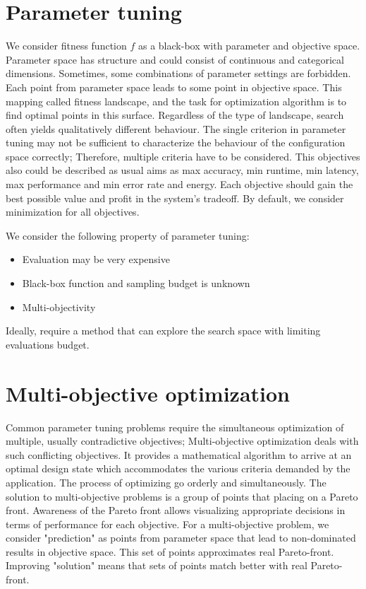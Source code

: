     \section{Parameter tuning}
        We consider fitness function $f$ as a black-box with parameter and objective space. Parameter space has structure and could consist of continuous and categorical dimensions. Sometimes, some combinations of parameter settings are forbidden. Each point from parameter space leads to some point in objective space. This mapping called fitness landscape, and the task for optimization algorithm is to find optimal points in this surface. Regardless of the type of landscape, search often yields qualitatively different behaviour.
        The single criterion in parameter tuning may not be sufficient to characterize the behaviour of the configuration space correctly; Therefore, multiple criteria have to be considered. This objectives also could be described as usual aims as max accuracy, min runtime, min latency, max performance and min error rate and energy. Each objective should gain the best possible value and profit in the system's tradeoff. By default, we consider minimization for all objectives. 

        We consider the following property of parameter tuning:
        \begin{itemize}
            \item Evaluation may be very expensive
            \item Black-box function and sampling budget is unknown
            \item Multi-objectivity
        \end{itemize}

        Ideally, require a method that can explore the search space with limiting evaluations budget. 
    

    \section{Multi-objective optimization}
        Common parameter tuning problems require the simultaneous optimization of multiple, usually contradictive objectives; Multi-objective optimization deals with such conflicting objectives. It provides a mathematical algorithm to arrive at an optimal design state which accommodates the various criteria demanded by the application. The process of optimizing go orderly and simultaneously. The solution to multi-objective problems is a group of points that placing on a Pareto front. Awareness of the Pareto front allows visualizing appropriate decisions in terms of performance for each objective. For a multi-objective problem, we consider "prediction" as points from parameter space that lead to non-dominated results in objective space. This set of points approximates real Pareto-front. Improving "solution" means that sets of points match better with real Pareto-front.

